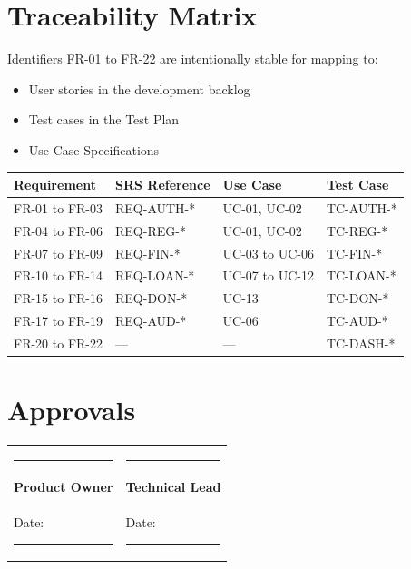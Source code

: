 \documentclass[11pt,a4paper]{article}
\begin{document}
\section{Traceability Matrix}

Identifiers FR-01 to FR-22 are intentionally stable for mapping to:
\begin{itemize}
    \item User stories in the development backlog
    \item Test cases in the Test Plan
    \item Use Case Specifications
\end{itemize}

\vspace{1em}

\begin{tabular}{@{}p{2.5cm}p{4cm}p{4cm}p{3cm}@{}}
\toprule
\textbf{Requirement} & \textbf{SRS Reference} & \textbf{Use Case} & \textbf{Test Case} \\
\midrule
FR-01 to FR-03 & REQ-AUTH-* & UC-01, UC-02 & TC-AUTH-* \\
FR-04 to FR-06 & REQ-REG-* & UC-01, UC-02 & TC-REG-* \\
FR-07 to FR-09 & REQ-FIN-* & UC-03 to UC-06 & TC-FIN-* \\
FR-10 to FR-14 & REQ-LOAN-* & UC-07 to UC-12 & TC-LOAN-* \\
FR-15 to FR-16 & REQ-DON-* & UC-13 & TC-DON-* \\
FR-17 to FR-19 & REQ-AUD-* & UC-06 & TC-AUD-* \\
FR-20 to FR-22 & --- & --- & TC-DASH-* \\
\bottomrule
\end{tabular}

\section{Approvals}

\vspace{1cm}

\begin{tabular}{@{}p{6cm}p{6cm}@{}}
\rule{5cm}{0.4pt} & \rule{5cm}{0.4pt} \\
\textbf{Product Owner} & \textbf{Technical Lead} \\
Date: \rule{3cm}{0.4pt} & Date: \rule{3cm}{0.4pt} \\
\end{tabular}
\end{document}
